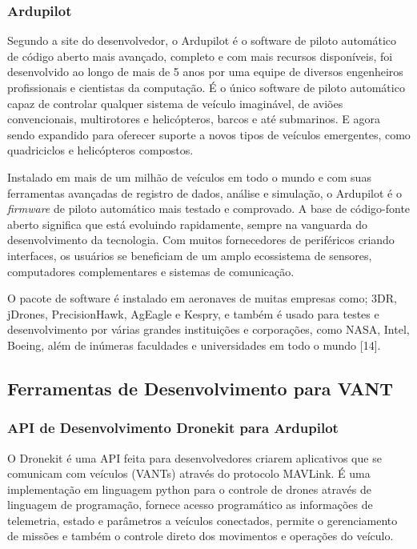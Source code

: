 \subsubsection{Ardupilot}
Segundo a site do desenvolvedor, o Ardupilot é o software de piloto automático de código aberto mais avançado, completo e com mais recursos disponíveis, foi desenvolvido ao longo de mais de 5 anos por uma equipe de diversos engenheiros profissionais e cientistas da computação. É o único software de piloto automático capaz de controlar qualquer sistema de veículo imaginável, de aviões convencionais, multirotores e helicópteros, barcos e até submarinos. E agora sendo expandido para oferecer suporte a novos tipos de veículos emergentes, como quadriciclos e helicópteros compostos.

Instalado em mais de um milhão de veículos em todo o mundo e com suas ferramentas avançadas de registro de dados, análise e simulação, o Ardupilot é o \textit{firmware} de piloto automático mais testado e comprovado. A base de código-fonte aberto significa que está evoluindo rapidamente, sempre na vanguarda do desenvolvimento da tecnologia. Com muitos fornecedores de periféricos criando interfaces, os usuários se beneficiam de um amplo ecossistema de sensores, computadores complementares e sistemas de comunicação.

O pacote de software é instalado em aeronaves de muitas empresas como; 3DR, jDrones, PrecisionHawk, AgEagle e Kespry, e também é usado para testes e desenvolvimento por várias grandes instituições e corporações, como NASA, Intel, Boeing, além de inúmeras faculdades e universidades em todo o mundo [14].

\subsection{Ferramentas de Desenvolvimento para VANT}

\subsubsection{API de Desenvolvimento Dronekit para Ardupilot}
O Dronekit é uma API feita para desenvolvedores criarem aplicativos que se comunicam com veículos (VANTs) através do protocolo MAVLink. É uma implementação em linguagem python para o controle de drones através de linguagem de programação, fornece acesso programático as informações de telemetria, estado e parâmetros a veículos conectados, permite o gerenciamento de missões e também o controle direto dos movimentos e operações do veículo.

